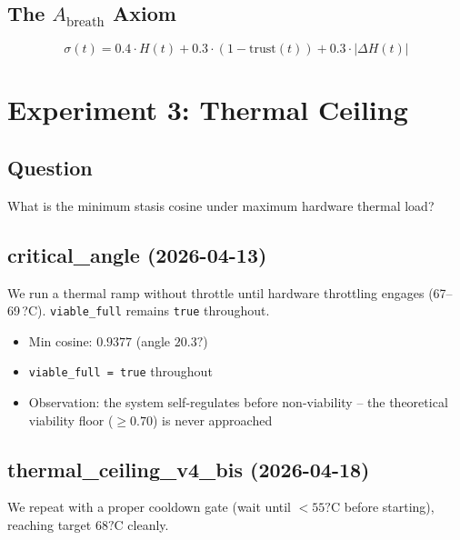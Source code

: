 \documentclass[11pt, a4paper]{article}
\begin{document}
\subsection{The \texorpdfstring{$A_\text{breath}$}{A\_breath} Axiom}

\begin{equation}
  \sigma(t) = 0.4 \cdot H(t) + 0.3 \cdot (1 - \mathrm{trust}(t))
              + 0.3 \cdot |\Delta H(t)|
\label{eq:breath}
\end{equation}


\section{Experiment 3: Thermal Ceiling}
\label{sec:thermal_ceiling}

\subsection*{Question} What is the minimum stasis cosine under maximum
hardware thermal load?

\subsection{critical\_angle (2026-04-13)}

We run a thermal ramp without throttle until hardware throttling engages
(67--69\,?C).
\texttt{viable\_full} remains \texttt{true} throughout.
\begin{itemize}
  \item Min cosine: $0.9377$ (angle $20.3?$)
  \item \texttt{viable\_full = true} throughout
  \item Observation: the system self-regulates before non-viability --
        the theoretical viability floor ($\ge 0.70$) is never approached
\end{itemize}

\subsection{thermal\_ceiling\_v4\_bis (2026-04-18)}

We repeat with a proper cooldown gate (wait until $< 55?\mathrm{C}$
before starting), reaching target $68?\mathrm{C}$ cleanly.
\end{document}
